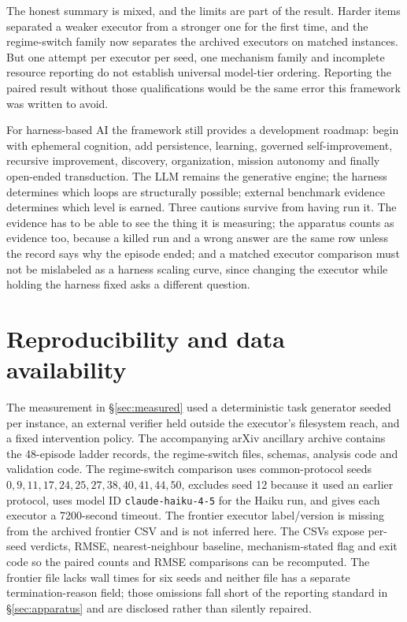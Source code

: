\documentclass[11pt]{article}
\theoremstyle{definition}
\begin{document}
The honest summary is mixed, and the limits are part of the result. Harder items separated a weaker executor from a stronger one for the first time, and the regime-switch family now separates the archived executors on matched instances. But one attempt per executor per seed, one mechanism family and incomplete resource reporting do not establish universal model-tier ordering. Reporting the paired result without those qualifications would be the same error this framework was written to avoid.

For harness-based AI the framework still provides a development roadmap: begin with ephemeral cognition, add persistence, learning, governed self-improvement, recursive improvement, discovery, organization, mission autonomy and finally open-ended transduction. The LLM remains the generative engine; the harness determines which loops are structurally possible; external benchmark evidence determines which level is earned. Three cautions survive from having run it. The evidence has to be able to see the thing it is measuring; the apparatus counts as evidence too, because a killed run and a wrong answer are the same row unless the record says why the episode ended; and a matched executor comparison must not be mislabeled as a harness scaling curve, since changing the executor while holding the harness fixed asks a different question.

\section*{Reproducibility and data availability}

The measurement in \S\ref{sec:measured} used a deterministic task generator seeded per instance, an external verifier held outside the executor's filesystem reach, and a fixed intervention policy. The accompanying arXiv ancillary archive  contains the 48-episode ladder records, the regime-switch files, schemas, analysis code and validation code. The regime-switch comparison uses common-protocol seeds $0,9,11,17,24,25,27,38,40,41,44,50$, excludes seed 12 because it used an earlier protocol, uses model ID \texttt{claude-haiku-4-5} for the Haiku run, and gives each executor a 7200-second timeout. The frontier executor label/version is missing from the archived frontier CSV and is not inferred here. The CSVs expose per-seed verdicts, RMSE, nearest-neighbour baseline, mechanism-stated flag and exit code so the paired counts and RMSE comparisons can be recomputed. The frontier file lacks wall times for six seeds and neither file has a separate termination-reason field; those omissions fall short of the reporting standard in \S\ref{sec:apparatus} and are disclosed rather than silently repaired.
\end{document}
